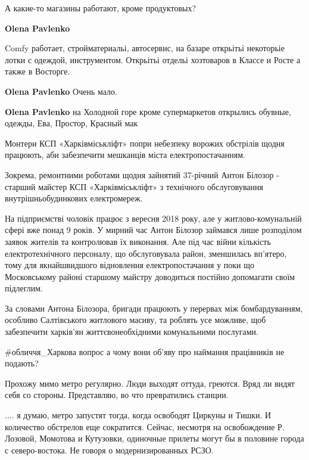\begin{itemize}
\begin{itemize}
\end{itemize} %

А какие-то магазины работают, кроме продуктовых?

\begin{itemize} %
\textbf{Olena Pavlenko} 

Comfy работает, стройматериальі, автосервис, на базаре открьітьі некоторьіе
лотки с одеждой, инструментом. Открьітьі отдельі хозтоваров в Классе и Росте а
также в Восторге.

\textbf{Olena Pavlenko} Очень мало.

\textbf{Olena Pavlenko} на Холодной горе кроме супермаркетов открылись обувные, одежды, Ева, Простор, Красный мак
\end{itemize} %


Монтери КСП «Харківміськліфт» попри небезпеку ворожих обстрілів щодня працюють,
аби забезпечити мешканців міста електропостачанням.

Зокрема, ремонтними роботами щодня зайнятий 37-річний Антон Білозор - старший
майстер КСП «Харківміськліфт» з технічного обслуговування внутрішньобудинкових
електромереж.

На підприємстві чоловік працює з вересня 2018 року, але у житлово-комунальній
сфері вже понад 9 років. У мирний час Антон Білозор займався лише розподілом
заявок жителів та контролював їх виконання. Але під час війни кількість
електротехнічного персоналу, що обслуговувала район, зменшилась вп'ятеро, тому
для якнайшвидшого відновлення електропостачання у поки що Московському районі
старшому майстру доводиться постійно допомагати своїм підлеглим.

За словами Антона Білозора, бригади працюють у перервах між бомбардуванням,
особливо Салтівського житлового масиву, та роблять усе можливе, щоб забезпечити
харків'ян життєвонеобхідними комунальними послугами.

\#обличчя\_Харкова вопрос а чому вони об'яву про наймання працівників не подають?


Прохожу мимо метро регулярно. Люди выходят оттуда, греются. Вряд ли видят себя
со стороны. Представляю, во что превратились станции.

.... я думаю, метро запустят тогда, когда освободят Циркуны и Тишки. И
количество обстрелов еще сократится. Сейчас, несмотря на освобождение Р.
Лозовой, Момотова и Кутузовки, одиночные прилеты могут бы в половине города с
северо-востока. Не говоря о модернизированных РСЗО.


\end{itemize}

